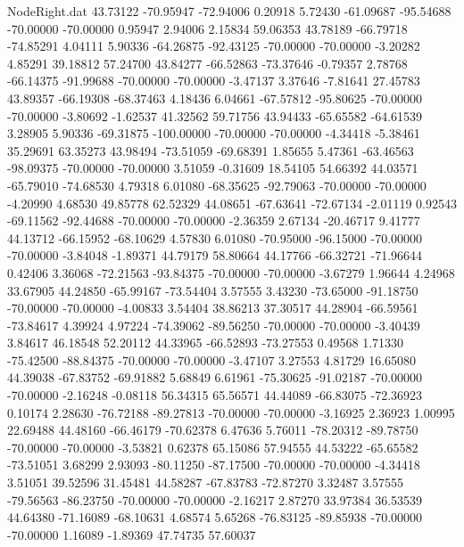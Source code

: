 \begin{filecontents}{NodeRight.dat}
  43.73122  -70.95947  -72.94006     0.20918    5.72430  -61.09687  -95.54688  -70.00000  -70.00000    0.95947    2.94006    2.15834   59.06353
  43.78189  -66.79718  -74.85291     4.04111    5.90336  -64.26875  -92.43125  -70.00000  -70.00000   -3.20282    4.85291   39.18812   57.24700
  43.84277  -66.52863  -73.37646    -0.79357    2.78768  -66.14375  -91.99688  -70.00000  -70.00000   -3.47137    3.37646   -7.81641   27.45783
  43.89357  -66.19308  -68.37463     4.18436    6.04661  -67.57812  -95.80625  -70.00000  -70.00000   -3.80692   -1.62537   41.32562   59.71756
  43.94433  -65.65582  -64.61539     3.28905    5.90336  -69.31875 -100.00000  -70.00000  -70.00000   -4.34418   -5.38461   35.29691   63.35273
  43.98494  -73.51059  -69.68391     1.85655    5.47361  -63.46563  -98.09375  -70.00000  -70.00000    3.51059   -0.31609   18.54105   54.66392
  44.03571  -65.79010  -74.68530     4.79318    6.01080  -68.35625  -92.79063  -70.00000  -70.00000   -4.20990    4.68530   49.85778   62.52329
  44.08651  -67.63641  -72.67134    -2.01119    0.92543  -69.11562  -92.44688  -70.00000  -70.00000   -2.36359    2.67134  -20.46717    9.41777
  44.13712  -66.15952  -68.10629     4.57830    6.01080  -70.95000  -96.15000  -70.00000  -70.00000   -3.84048   -1.89371   44.79179   58.80664
  44.17766  -66.32721  -71.96644     0.42406    3.36068  -72.21563  -93.84375  -70.00000  -70.00000   -3.67279    1.96644    4.24968   33.67905
  44.24850  -65.99167  -73.54404     3.57555    3.43230  -73.65000  -91.18750  -70.00000  -70.00000   -4.00833    3.54404   38.86213   37.30517
  44.28904  -66.59561  -73.84617     4.39924    4.97224  -74.39062  -89.56250  -70.00000  -70.00000   -3.40439    3.84617   46.18548   52.20112
  44.33965  -66.52893  -73.27553     0.49568    1.71330  -75.42500  -88.84375  -70.00000  -70.00000   -3.47107    3.27553    4.81729   16.65080
  44.39038  -67.83752  -69.91882     5.68849    6.61961  -75.30625  -91.02187  -70.00000  -70.00000   -2.16248   -0.08118   56.34315   65.56571
  44.44089  -66.83075  -72.36923     0.10174    2.28630  -76.72188  -89.27813  -70.00000  -70.00000   -3.16925    2.36923    1.00995   22.69488
  44.48160  -66.46179  -70.62378     6.47636    5.76011  -78.20312  -89.78750  -70.00000  -70.00000   -3.53821    0.62378   65.15086   57.94555
  44.53222  -65.65582  -73.51051     3.68299    2.93093  -80.11250  -87.17500  -70.00000  -70.00000   -4.34418    3.51051   39.52596   31.45481
  44.58287  -67.83783  -72.87270     3.32487    3.57555  -79.56563  -86.23750  -70.00000  -70.00000   -2.16217    2.87270   33.97384   36.53539
  44.64380  -71.16089  -68.10631     4.68574    5.65268  -76.83125  -89.85938  -70.00000  -70.00000    1.16089   -1.89369   47.74735   57.60037

\end{filecontents}
